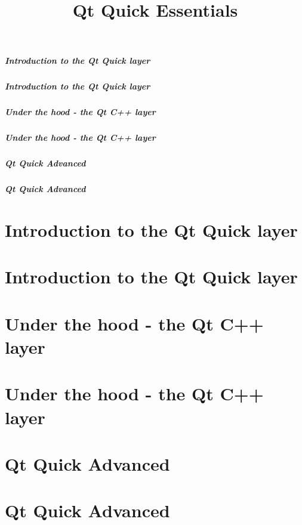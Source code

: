 \documentclass[t]{beamer}
\title{Qt Quick Essentials}
\begin{document}


\setcounter{tocdepth}{2} %
\begin{frame}
  \frametitle{Introduction to the Qt Quick layer}
  \tableofcontents[part=1]
\end{frame}

\begin{frame}
  \frametitle{Introduction to the Qt Quick layer}
  \tableofcontents[part=2]
\end{frame}

\begin{frame}
  \frametitle{Under the hood - the Qt C++ layer}
  \tableofcontents[part=3]
\end{frame}

\begin{frame}
  \frametitle{Under the hood - the Qt C++ layer}
  \tableofcontents[part=4]
\end{frame}

\begin{frame}
  \frametitle{Qt Quick Advanced}
  \tableofcontents[part=5]
\end{frame}

\begin{frame}
  \frametitle{Qt Quick Advanced}
  \tableofcontents[part=6]
\end{frame}

\setcounter{tocdepth}{3} %

\part{Introduction to the Qt Quick layer}




\part{Introduction to the Qt Quick layer}





\part{Under the hood - the Qt C++ layer}




\part{Under the hood - the Qt C++ layer}


\part{Qt Quick Advanced}



\part{Qt Quick Advanced}




\end{document}
